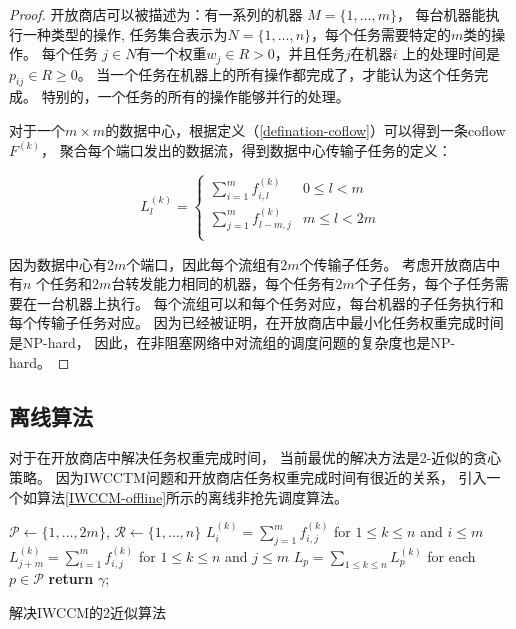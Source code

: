 \begin{proof}
开放商店可以被描述为：有一系列的机器 $M = \{1,...,m\}$，
每台机器能执行一种类型的操作,
任务集合表示为$N = \{1,...,n\}$，每个任务需要特定的$m$类的操作。
每个任务 $j \in N$有一个权重$w_j \in R > 0$，并且任务$j$在机器$i$ 上的处理时间是$p_{ij} \in R\ge0$。
当一个任务在机器上的所有操作都完成了，才能认为这个任务完成。
特别的，一个任务的所有的操作能够并行的处理。

对于一个$m \times m$的数据中心，根据定义（\ref{defination-coflow}）可以得到一条coflow $F^{(k)}$，
聚合每个端口发出的数据流，得到数据中心传输子任务的定义：

\begin{equation}
\label{coflow-subtask}
 L_l^{(k)}=\left\{
\begin{array}{rcl}
\sum_{i=1}^{m}f_{i,l}^{(k)}& {0      \le l   <m} \\
\sum_{j=1}^{m}f_{l-m,j}^{(k)} & {m      \le l   <2m} \\
\end{array} \right. 
\end{equation}

因为数据中心有$2m$个端口，因此每个流组有$2m$个传输子任务。
考虑开放商店中有$n$ 个任务和$2m$台转发能力相同的机器，每个任务有$2m$个子任务，每个子任务需要在一台机器上执行。
每个流组可以和每个任务对应，每台机器的子任务执行和每个传输子任务对应。
因为已经被证明，在开放商店中最小化任务权重完成时间是NP-hard\cite{mastrolilli2010minimizing}\cite{chen2000supply}\cite{roemer2006note}\cite{Qiu2016Experimental}，
因此，在非阻塞网络中对流组的调度问题的复杂度也是NP-hard。
\end{proof}


\subsection{离线算法}
对于在开放商店中解决任务权重完成时间，
当前最优的解决方法是2-近似的贪心策略\cite{mastrolilli2010minimizing,kumar2011lp}。
因为IWCCTM问题和开放商店任务权重完成时间有很近的关系，
引入一个如算法\ref{IWCCM-offline}所示的离线非抢先调度算法。




\begin{algorithm}
$\mathcal{P} \gets \{1, \dots, 2m\}$, $\mathcal{R} \gets \{1, \dots, n\}$\;
 $L_i^{(k)}= \sum_{j=1}^mf_{i,j}^{(k)}$  for $1 \le k \le n$ and $i \le m$\;
  $L_{j+m}^{(k)}= \sum_{i=1}^mf_{i,j}^{(k)}$ for $1 \le k \le n$ and $ j \le m$\;
 $L_p=\sum_{1 \le k \le n}L_p^{(k)}$ for each $p \in \mathcal{P}$\;
  \textbf{return} $\gamma$;
  \caption{解决IWCCM的2近似算法}
  \label{IWCCM-offline}
 \end{algorithm}
 
